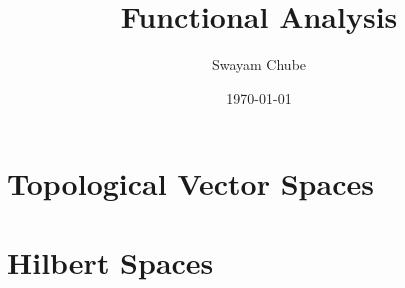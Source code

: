 \documentclass[oneside]{report}
\title{Functional Analysis}
\author{Swayam Chube}
\date{\today}
\begin{document}
\maketitle 
\tableofcontents

\chapter{Topological Vector Spaces}


\chapter{Hilbert Spaces}

\end{document}
